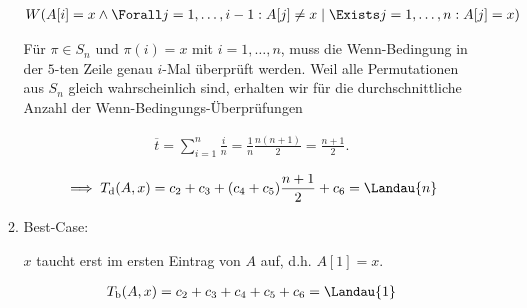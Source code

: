\begin{solution}
\begin{enumerate}[label = (\alph*)]
\begin{enumerate}[label = \arabic*.]
    \begin{align*}
      W
      (
        A[i] = x
        \land
        \Forall j = 1, \dots, i-1:
        A[j] \neq x
        \mid
        \Exists j = 1, \dots, n:
        A[j] = x
      )
    \end{align*}

    Für $\pi \in S_n$ und $\pi(i) = x$ mit $i = 1, \dots, n$, muss die Wenn-Bedingung in der $5$-ten Zeile genau $i$-Mal überprüft werden.
    Weil alle Permutationen aus $S_n$ gleich wahrscheinlich sind, erhalten wir für die durchschnittliche Anzahl der Wenn-Bedingungs-Überprüfungen

    \begin{align*}
      \overline{t}
      =
      \sum_{i=1}^n \frac{i}{n}
      =
      \frac{1}{n} \frac{n (n + 1)}{2}
      =
      \frac{n + 1}{2}.
    \end{align*}

    \begin{align*}
      \implies
      T_{\mathrm{d}}(A, x)
      =
      c_2 + c_3 + (c_4 + c_5) \frac{n + 1}{2} + c_6
      =
      \Landau{n}
    \end{align*}

    \item Best-Case:

    $x$ taucht erst im ersten Eintrag von $A$ auf, d.h. $A[1] = x$.

    \begin{align*}
      T_{\mathrm{b}}(A, x)
      =
      c_2 + c_3 + c_4 + c_5 + c_6
      =
      \Landau{1}
    \end{align*}

  \end{enumerate}

\end{enumerate}

\end{solution}


